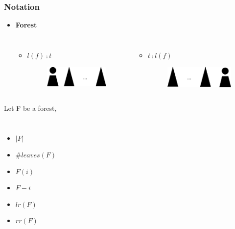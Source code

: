 \documentclass{beamer}
\begin{document}
\begin{frame}
\frametitle{Notation}
\begin{itemize}
\item \textbf{Forest} 
\begin{columns}[c] %
\begin{itemize}
\item $l(f) \comp t$
\begin{figure}
	\includegraphics[width=0.8\linewidth]{Forest}
	\label{Forest} 
	\centering
\end{figure}
\end{itemize}
\begin{itemize}
\item $t \comp l(f)$
\begin{figure}
	\includegraphics[width=0.8\linewidth]{Forest2}
	\label{Another Forest Representation} 
	\centering
\end{figure}
\end{itemize}
\end{columns}
\end{itemize}
Let F be a forest,
\begin{columns}[c]
\begin{itemize}
\item \emph{$\left\vert F \right\vert$}
\item \emph{$\#leaves(F)$}
\item \emph{$F(i)$}
\item \emph{$F - i$}
\item \emph{$lr(F)$}
\item \emph{$rr(F)$}
\end{itemize}

\end{columns}
\end{frame}
\end{document}
